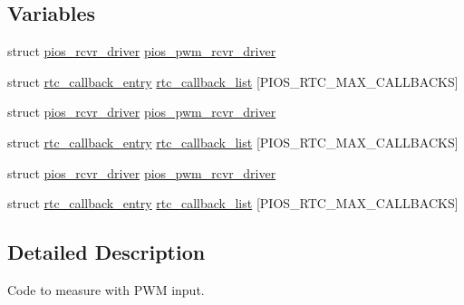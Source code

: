 \subsection*{Variables}
\begin{DoxyCompactItemize}
\item 
struct \hyperlink{structpios__rcvr__driver}{pios\-\_\-rcvr\-\_\-driver} \hyperlink{group___p_i_o_s___p_w_m_ga767a19a3a54afa71399b7467963690df}{pios\-\_\-pwm\-\_\-rcvr\-\_\-driver}
\item 
struct \hyperlink{structrtc__callback__entry}{rtc\-\_\-callback\-\_\-entry} \hyperlink{group___p_i_o_s___p_w_m_ga4cb0707cdd245f2578d3f444bd852fd7}{rtc\-\_\-callback\-\_\-list} \mbox{[}P\-I\-O\-S\-\_\-\-R\-T\-C\-\_\-\-M\-A\-X\-\_\-\-C\-A\-L\-L\-B\-A\-C\-K\-S\mbox{]}
\item 
struct \hyperlink{structpios__rcvr__driver}{pios\-\_\-rcvr\-\_\-driver} \hyperlink{group___p_i_o_s___p_w_m_ga767a19a3a54afa71399b7467963690df}{pios\-\_\-pwm\-\_\-rcvr\-\_\-driver}
\item 
struct \hyperlink{structrtc__callback__entry}{rtc\-\_\-callback\-\_\-entry} \hyperlink{group___p_i_o_s___p_w_m_ga4cb0707cdd245f2578d3f444bd852fd7}{rtc\-\_\-callback\-\_\-list} \mbox{[}P\-I\-O\-S\-\_\-\-R\-T\-C\-\_\-\-M\-A\-X\-\_\-\-C\-A\-L\-L\-B\-A\-C\-K\-S\mbox{]}
\item 
struct \hyperlink{structpios__rcvr__driver}{pios\-\_\-rcvr\-\_\-driver} \hyperlink{group___p_i_o_s___p_w_m_ga767a19a3a54afa71399b7467963690df}{pios\-\_\-pwm\-\_\-rcvr\-\_\-driver}
\item 
struct \hyperlink{structrtc__callback__entry}{rtc\-\_\-callback\-\_\-entry} \hyperlink{group___p_i_o_s___p_w_m_ga4cb0707cdd245f2578d3f444bd852fd7}{rtc\-\_\-callback\-\_\-list} \mbox{[}P\-I\-O\-S\-\_\-\-R\-T\-C\-\_\-\-M\-A\-X\-\_\-\-C\-A\-L\-L\-B\-A\-C\-K\-S\mbox{]}
\end{DoxyCompactItemize}


\subsection{Detailed Description}
Code to measure with P\-W\-M input. 

